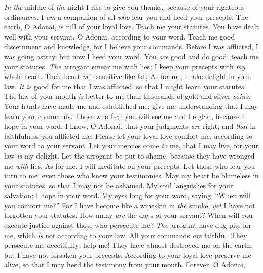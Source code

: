 \begin{biblechapter}
\verse \textit{In the} middle of \textit{the} night I rise to give you thanks, 
because of your righteous ordinances.
\verse I \textit{am} a companion of all \textit{who} fear you 
and heed your precepts.
\verse The earth, O Adonai, is full of your loyal love. 
Teach me your statutes.
 You have dealt well with your servant, 
O Adonai, according to your word.
\verse Teach me good discernment and knowledge, 
for I believe your commands.
\verse Before I was afflicted, I was going astray, 
but now I heed your word.
\verse You \textit{are} good and do good; 
teach me your statutes.
\verse \textit{The} arrogant smear me with lies; 
I keep your precepts with \textit{my} whole heart.
\verse Their heart \textit{is} insensitive like fat; 
As for me, I take delight in your law.
\verse \textit{It is} good for me that I was afflicted, 
so that I might learn your statutes.
\verse The law of your mouth \textit{is} better to me 
than thousands of gold and silver \textit{coins}.
 Your hands have made me and established me; 
give me understanding that I may learn your commands.
\verse Those who fear you will see me and be glad, 
because I hope in your word.
\verse I know, O Adonai, that your judgments \textit{are} right, 
and \textit{that} in faithfulness you afflicted me.
\verse Please let your loyal love comfort me, 
according to your word to your servant.
\verse Let your mercies come \textit{to} me, that I may live, 
for your law \textit{is} my delight.
\verse Let the arrogant be put to shame, 
because they have wronged me \textit{with} lies. 
As for me, I will meditate on your precepts.
\verse Let those who fear you turn to me, 
even those who know your testimonies.
\verse May my heart be blameless in your statutes, 
so that I may not be ashamed.
 My soul languishes for your salvation; 
I hope in your word.
\verse My eyes long for your word, 
saying, “When will you comfort me?”
\verse For I have become like a wineskin in \textit{the} smoke, 
\textit{yet} I have not forgotten your statutes.
\verse How many \textit{are} the days of your servant? 
When will you execute justice against those who persecute me?
\verse \textit{The} arrogant have dug pits for me, 
which \textit{is} not according to your law.
\verse All your commands \textit{are} faithful. 
They persecute me deceitfully; help me!
\verse They have almost destroyed me on the earth, 
but I have not forsaken your precepts.
\verse According to your loyal love preserve me alive, 
so that I may heed the testimony from your mouth.
 Forever, O Adonai, 

\end{biblechapter}
